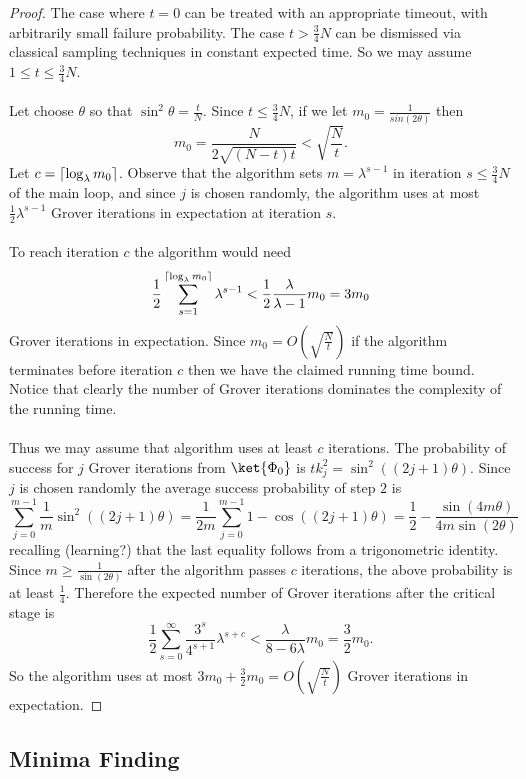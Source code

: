 \begin{proof}
The case where $t=0$ can be treated with an appropriate timeout, with arbitrarily small failure probability. The case $t > \frac{3}{4}N$ can be dismissed via classical sampling techniques in constant expected time. So we may assume $1\leq t\leq \frac{3}{4}N$.
\paragraph{}
Let choose $\theta$ so that $\sin^2\theta = \frac{t}{N}$. Since $t\leq \frac{3}{4}N$, if we let $m_0 = \frac{1}{sin(2\theta)}$ then
$$m_0 = \frac{N}{2\sqrt{(N-t)t}} < \sqrt{\frac{N}{t}}.$$
Let $c = \left\lceil\log_\lambda m_0\right\rceil$. Observe that the algorithm sets $m =\lambda^{s-1}$ in iteration $s \leq \frac{3}{4}N$ of the main loop, and since $j$ is chosen randomly, the algorithm uses at most $\frac{1}{2} \lambda^{s-1}$ Grover iterations in expectation at iteration $s$. 
\paragraph{}
To reach iteration $c$ the algorithm would need
$$\frac{1}{2}\sum_{s=1}^{\left\lceil\log_\lambda m_0\right\rceil} \lambda^{s-1} <\frac{1}{2}\frac{\lambda}{\lambda - 1} m_0 = 3m_0$$
Grover iterations in expectation. Since $m_0 = O(\sqrt{\frac{N}{t}})$ if the algorithm terminates before iteration $c$ then we have the claimed running time bound. Notice that clearly the number of Grover iterations dominates the complexity of the running time.
\paragraph{}
Thus we may assume that algorithm uses at least $c$ iterations. The probability of success for $j$ Grover iterations from $\ket{\Phi_0}$ is $tk_j^2= \sin^2((2j+1)\theta)$. Since $j$ is chosen randomly the average success probability of step $2$ is
$$\sum_{j=0}^{m-1}\frac{1}{m}\sin^2((2j+1)\theta) = \frac{1}{2m}\sum_{j=0}^{m-1}1 - \cos((2j+1)\theta) = \frac{1}{2} - \frac{\sin(4m\theta)}{4m\sin(2\theta)}$$
recalling (learning?) that the last equality follows from a trigonometric identity. Since $m \geq \frac{1}{\sin(2\theta)}$ after the algorithm passes $c$ iterations, the above probability is at least $\frac{1}{4}$. Therefore the expected number of Grover iterations after the critical stage is
$$ \frac{1}{2}\sum_{s=0}^\infty \frac{3^s}{4^{s+1}}\lambda^{s+c} < \frac{\lambda}{8-6\lambda}m_0 = \frac{3}{2} m_0. $$
So the algorithm uses at most $3m_0 + \frac{3}{2}m_0 = O(\sqrt{\frac{N}{t}})$ Grover iterations in expectation.
\end{proof}
\subsection{Minima Finding}